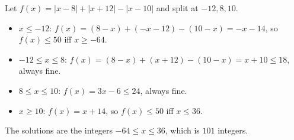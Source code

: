 Let $f(x)=|x-8|+|x+12|-|x-10|$ and split at $-12,8,10$.
\begin{itemize}
\item $x\le-12$: $f(x)=(8-x)+(-x-12)-(10-x)=-x-14$, so $f(x)\le50$ iff $x\ge-64$.
\item $-12\le x\le8$: $f(x)=(8-x)+(x+12)-(10-x)=x+10\le18$, always fine.
\item $8\le x\le10$: $f(x)=3x-6\le24$, always fine.
\item $x\ge10$: $f(x)=x+14$, so $f(x)\le50$ iff $x\le36$.
\end{itemize}
The solutions are the integers $\boxed{-64\le x\le36}$, which is $101$ integers.
